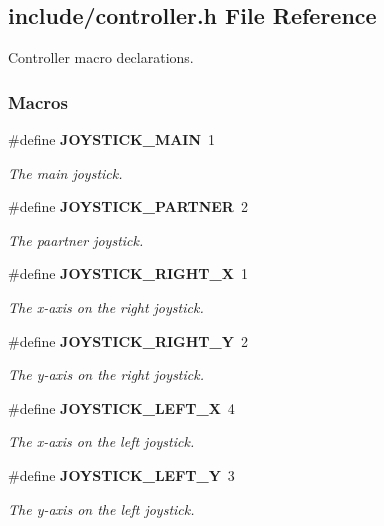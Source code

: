 \subsection{include/controller.h File Reference}
\label{controller_8h}


Controller macro declarations.  


\subsubsection*{Macros}
\begin{DoxyCompactItemize}
\item 
\#define \textbf{ J\+O\+Y\+S\+T\+I\+C\+K\+\_\+\+M\+A\+IN}~1
\begin{DoxyCompactList}\small\item\em The main joystick. \end{DoxyCompactList}\item 
\#define \textbf{ J\+O\+Y\+S\+T\+I\+C\+K\+\_\+\+P\+A\+R\+T\+N\+ER}~2
\begin{DoxyCompactList}\small\item\em The paartner joystick. \end{DoxyCompactList}\item 
\#define \textbf{ J\+O\+Y\+S\+T\+I\+C\+K\+\_\+\+R\+I\+G\+H\+T\+\_\+X}~1
\begin{DoxyCompactList}\small\item\em The x-\/axis on the right joystick. \end{DoxyCompactList}\item 
\#define \textbf{ J\+O\+Y\+S\+T\+I\+C\+K\+\_\+\+R\+I\+G\+H\+T\+\_\+Y}~2
\begin{DoxyCompactList}\small\item\em The y-\/axis on the right joystick. \end{DoxyCompactList}\item 
\#define \textbf{ J\+O\+Y\+S\+T\+I\+C\+K\+\_\+\+L\+E\+F\+T\+\_\+X}~4
\begin{DoxyCompactList}\small\item\em The x-\/axis on the left joystick. \end{DoxyCompactList}\item 
\#define \textbf{ J\+O\+Y\+S\+T\+I\+C\+K\+\_\+\+L\+E\+F\+T\+\_\+Y}~3
\begin{DoxyCompactList}\small\item\em The y-\/axis on the left joystick. \end{DoxyCompactList}\end{DoxyCompactItemize}
